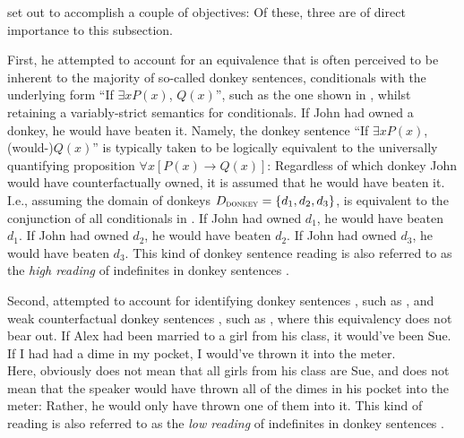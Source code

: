 \textcite{vanRooij2006} set out to accomplish a couple of objectives: Of these, three are of direct importance to this subsection.

First, he attempted to account for an equivalence that is often perceived to be inherent to the majority of so-called donkey sentences, conditionals with the underlying form \enquote{If $\exists{x}P(x)$, $Q(x)$}, such as the one shown in , whilst retaining a variably-strict semantics for conditionals.
\ex{}
If John had owned a donkey, he would have beaten it.
\xe
Namely, the donkey sentence \enquote{If $\exists{x}P(x)$, (would-)$Q(x)$} is typically taken to be logically equivalent to the universally quantifying proposition $\forall{x}[P(x)\rightarrow Q(x)]$: Regardless of which donkey John would have counterfactually owned, it is assumed that he would have beaten it. I.e., assuming the domain of donkeys $D_\text{\scshape donkey}=\{d_1,d_2,d_3\}$,  is equivalent to the conjunction of all conditionals in .
\pex[nopreamble=true]\label{ex:donkey-conjunction}%
\a{} If John had owned $d_1$, he would have beaten $d_1$.
\a{} If John had owned $d_2$, he would have beaten $d_2$.
\a{} If John had owned $d_3$, he would have beaten $d_3$.
\xe
This kind of donkey sentence reading is also referred to as the \textit{high reading} of indefinites in donkey sentences \parencite{Walker2015}.

Second, \textcite{vanRooij2006} attempted to account for identifying donkey sentences \parencite[p.~393f]{vanRooij2006}, such as , and weak counterfactual donkey sentences \parencite[first (non-counterfactual) observation due][]{Schubert1987}, such as , where this equivalency does not bear out.
\pex[nopreamble=true]%
\a{}  If Alex had been married to a girl from his class, it would've been Sue.\\\emptyfill\parencite[adapted from][p.~394]{vanRooij2006}
\a{}  If I had had a dime in my pocket, I would've thrown it into the meter.\\\emptyfill\parencites[adapted from][]{Schubert1987}[p.~395]{vanRooij2006}
\xe
Here,  obviously does not mean that all girls from his class are Sue, and  does not mean that the speaker would have thrown all of the dimes in his pocket into the meter: Rather, he would only have thrown one of them into it. This kind of reading is also referred to as the \textit{low reading} of indefinites in donkey sentences \parencite{Walker2015}.

